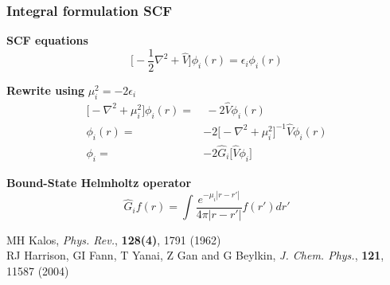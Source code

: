 \documentclass[mathserif, 10pt]{beamer}
\begin{document}
\begin{frame}
    \frametitle{Integral formulation SCF}
    \centering
    \textbf{SCF equations}
    \begin{equation}
	\nonumber
	\bigg[-\frac{1}{2}\nabla^2 + \hat{V}\bigg]\phi_i(r) = \epsilon_i \phi_i(r)
    \end{equation}

    \vspace{5mm}

    \textbf{Rewrite using} $\mu_i^2 = -2\epsilon_i$
    \begin{align}
	\nonumber
	\Big[-\nabla^2 + \mu_i^2\Big]\phi_i(r) =&\ -2\hat{V}\phi_i(r)\\
	\nonumber
	\phi_i(r) =&-2\Big[-\nabla^2 + \mu_i^2\Big]^{-1}\hat{V}\phi_i(r)\\
	\nonumber
	\phi_i =&-2\hat{G}_i\Big[\hat{V}\phi_i\Big]
    \end{align}

    \vspace{5mm}

    \textbf{Bound-State Helmholtz operator}
    \begin{equation}
	\nonumber
	\hat{G}_if(r) = \int \frac{e^{-\mu_i |r-r'|}}{4\pi|r-r'|}f(r')dr'
    \end{equation}

    \vspace{5mm}

    \centering
    \tiny
    MH Kalos,
    {\it Phys. Rev.}, 
    \textbf{128(4)},
    1791 (1962)\\
    RJ Harrison, GI Fann, T Yanai, Z Gan and G Beylkin,
    {\it J. Chem. Phys.}, 
    \textbf{121},
    11587 (2004)
\end{frame}
\end{document}
